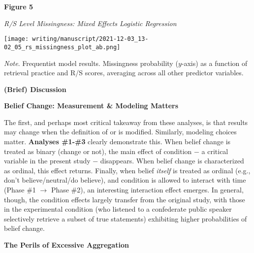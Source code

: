 \documentclass[12pt]{article}  %
\begin{document}
\textbf{Figure 5}

\textit{R/S Level Missingness: Mixed Effects Logistic Regression}

\vspace{0.5cm}

\hspace{-1.5cm}\texttt{[image: writing/manuscript/2021-12-03\_13-02\_05\_rs\_missingness\_plot\_ab.png]}

\singlespacing
\noindent\textit{Note}. Frequentist model results. Missingness probability ($y$-axis) as a function of retrieval practice and R/S scores, averaging across all other predictor variables.

\newpage


\doublespacing

\begin{center}
    \textbf{(Brief) Discussion}
\end{center}

\noindent\textbf{Belief Change: Measurement \& Modeling Matters}

The first, and perhaps most critical takeaway from these analyses, is that results may change when the definition of  or  is modified. Similarly, modeling choices matter. \textbf{Analyses \#1-\#3} clearly demonstrate this. When belief change is treated as binary (change or not), the main effect of condition $-$ a critical variable in the present study $-$ disappears. When belief change is characterized as ordinal, this effect returns. Finally, when belief \textit{itself} is treated as ordinal (e.g., don't believe/neutral/do believe), and condition is allowed to interact with time (Phase \#1 $\rightarrow$ Phase \#2), an interesting interaction effect emerges. In general, though, the condition effects largely transfer from the original study, with those in the experimental condition (who listened to a confederate public speaker selectively retrieve a subset of true statements) exhibiting higher probabilities of belief change. 

\noindent\textbf{The Perils of Excessive Aggregation}
\end{document}
